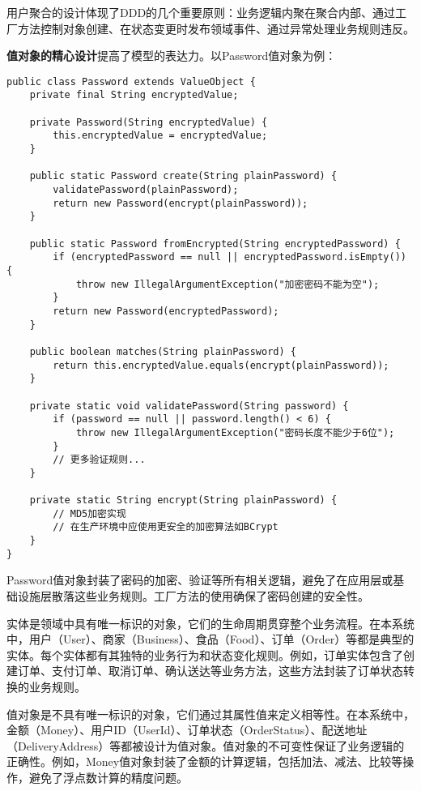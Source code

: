 \documentclass[a4paper,12pt]{article}
\begin{document}
用户聚合的设计体现了DDD的几个重要原则：业务逻辑内聚在聚合内部、通过工厂方法控制对象创建、在状态变更时发布领域事件、通过异常处理业务规则违反。

\textbf{值对象的精心设计}提高了模型的表达力。以Password值对象为例：

\begin{lstlisting}[caption=Password值对象实现]
public class Password extends ValueObject {
    private final String encryptedValue;
    
    private Password(String encryptedValue) {
        this.encryptedValue = encryptedValue;
    }
    
    public static Password create(String plainPassword) {
        validatePassword(plainPassword);
        return new Password(encrypt(plainPassword));
    }
    
    public static Password fromEncrypted(String encryptedPassword) {
        if (encryptedPassword == null || encryptedPassword.isEmpty()) {
            throw new IllegalArgumentException("加密密码不能为空");
        }
        return new Password(encryptedPassword);
    }
    
    public boolean matches(String plainPassword) {
        return this.encryptedValue.equals(encrypt(plainPassword));
    }
    
    private static void validatePassword(String password) {
        if (password == null || password.length() < 6) {
            throw new IllegalArgumentException("密码长度不能少于6位");
        }
        // 更多验证规则...
    }
    
    private static String encrypt(String plainPassword) {
        // MD5加密实现
        // 在生产环境中应使用更安全的加密算法如BCrypt
    }
}
\end{lstlisting}

Password值对象封装了密码的加密、验证等所有相关逻辑，避免了在应用层或基础设施层散落这些业务规则。工厂方法的使用确保了密码创建的安全性。

实体是领域中具有唯一标识的对象，它们的生命周期贯穿整个业务流程。在本系统中，用户（User）、商家（Business）、食品（Food）、订单（Order）等都是典型的实体。每个实体都有其独特的业务行为和状态变化规则。例如，订单实体包含了创建订单、支付订单、取消订单、确认送达等业务方法，这些方法封装了订单状态转换的业务规则。

值对象是不具有唯一标识的对象，它们通过其属性值来定义相等性。在本系统中，金额（Money）、用户ID（UserId）、订单状态（OrderStatus）、配送地址（DeliveryAddress）等都被设计为值对象。值对象的不可变性保证了业务逻辑的正确性。例如，Money值对象封装了金额的计算逻辑，包括加法、减法、比较等操作，避免了浮点数计算的精度问题。
\end{document}
